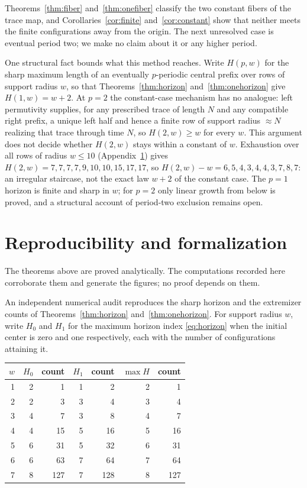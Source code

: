 \documentclass[11pt]{article}
\begin{document}
Theorems~\ref{thm:fiber} and~\ref{thm:onefiber} classify the two constant fibers
of the trace map, and Corollaries~\ref{cor:finite} and~\ref{cor:constant} show
that neither meets the finite configurations away from the origin.  The next
unresolved case is eventual period two; we make no claim about it or any higher
period.

One structural fact bounds what this method reaches.  Write $H(p,w)$ for the
sharp maximum length of an eventually $p$-periodic central prefix over rows of
support radius $w$, so that Theorems~\ref{thm:horizon}
and~\ref{thm:onehorizon} give $H(1,w)=w+2$.  At $p=2$ the constant-case
mechanism has no analogue: left permutivity supplies, for any prescribed trace
of length $N$ and any compatible right prefix, a unique left half and hence a
finite row of support radius $\approx N$ realizing that trace through time $N$,
so $H(2,w)\ge w$ for every $w$.  This argument does not decide whether
$H(2,w)$ stays within a constant of $w$.  Exhaustion over all rows of radius
$w\le10$ (Appendix~\ref{app:repro}) gives $H(2,w)=7,7,7,7,9,10,10,15,17,17$, so
$H(2,w)-w=6,5,4,3,4,4,3,7,8,7$: an irregular staircase, not the exact law
$w+2$ of the constant case.  The $p=1$ horizon is finite and sharp in $w$; for
$p=2$ only linear growth from below is proved, and a structural account of
period-two exclusion remains open.

\appendix
\section{Reproducibility and formalization}\label{app:repro}

The theorems above are proved analytically.  The computations recorded here
corroborate them and generate the figures; no proof depends on them.

An independent numerical audit reproduces the sharp horizon and the extremizer
counts of Theorems~\ref{thm:horizon} and~\ref{thm:onehorizon}.  For support
radius $w$, write $H_0$ and $H_1$ for the maximum horizon index
\eqref{eq:horizon} when the initial center is zero and one respectively, each
with the number of configurations attaining it.

\begin{center}
\small
\begin{tabular}{@{}rrrrrrr@{}}
\toprule
$w$ & $H_0$ & count & $H_1$ & count & $\max H$ & count\\
\midrule
1&2&1&1&2&2&1\\
2&2&3&3&4&3&4\\
3&4&7&3&8&4&7\\
4&4&15&5&16&5&16\\
5&6&31&5&32&6&31\\
6&6&63&7&64&7&64\\
7&8&127&7&128&8&127\\
\bottomrule
\end{tabular}
\end{center}
\end{document}
